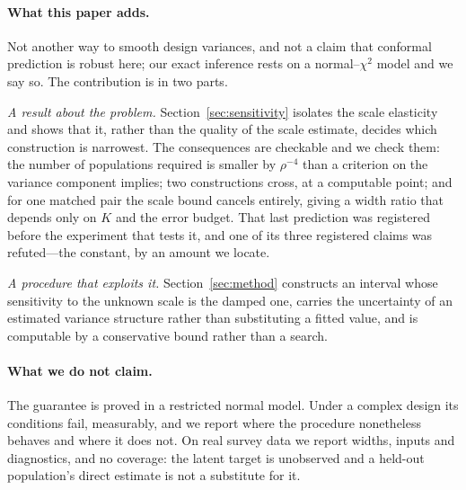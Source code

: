 \paragraph{What this paper adds.} Not another way to smooth design variances, and
not a claim that conformal prediction is robust here; our exact inference rests
on a normal--$\chi^2$ model and we say so. The contribution is in two parts.

\emph{A result about the problem.} Section~\ref{sec:sensitivity} isolates the
scale elasticity and shows that it, rather than the quality of the scale
estimate, decides which construction is narrowest. The consequences are checkable
and we check them: the number of populations required is smaller by $\rho^{-4}$
than a criterion on the variance component implies; two constructions cross, at a
computable point; and for one matched pair the scale bound cancels entirely,
giving a width ratio that depends only on $K$ and the error budget. That last
prediction was registered before the experiment that tests it, and one of its
three registered claims was refuted---the constant, by an amount we locate.

\emph{A procedure that exploits it.} Section~\ref{sec:method} constructs an
interval whose sensitivity to the unknown scale is the damped one, carries the
uncertainty of an estimated variance structure rather than substituting a fitted
value, and is computable by a conservative bound rather than a search.

\paragraph{What we do not claim.} The guarantee is proved in a restricted normal
model. Under a complex design its conditions fail, measurably, and we report
where the procedure nonetheless behaves and where it does not. On real survey
data we report widths, inputs and diagnostics, and no coverage: the latent target
is unobserved and a held-out population's direct estimate is not a substitute for
it.
